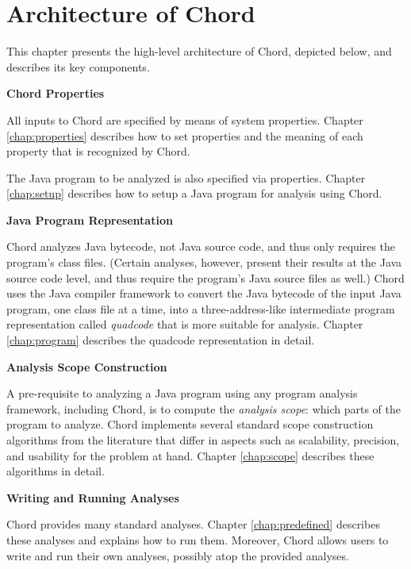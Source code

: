 \chapter{Architecture of Chord}
\label{chap:arch}

This chapter presents the high-level architecture of Chord, depicted below, and describes its key components.

\begin{center}
\end{center}

{\bf Chord Properties}

All inputs to Chord are specified by means of system properties.  Chapter
\ref{chap:properties} describes how to set properties and the meaning of each
property that is recognized by Chord.

The Java program to be analyzed is also specified via properties.  Chapter
\ref{chap:setup} describes how to setup a Java program for analysis using Chord.

{\bf Java Program Representation}

Chord analyzes Java bytecode, not Java source code, and thus only requires the
program's class files.  (Certain analyses, however, present their results at the
Java source code level, and thus require the program's Java source files as
well.) Chord uses the  Java compiler
framework to convert the Java bytecode of the input Java program, one class file
at a time, into a three-address-like intermediate program representation called
{\it quadcode} that is more suitable for analysis. Chapter \ref{chap:program}
describes the quadcode representation in detail.

{\bf Analysis Scope Construction}

A pre-requisite to analyzing a Java program using any program analysis
framework, including Chord, is to compute the {\it analysis scope}: which parts
of the program to analyze.  Chord implements several standard scope construction
algorithms from the literature that differ in aspects such as scalability,
precision, and usability for the problem at hand.  Chapter \ref{chap:scope}
describes these algorithms in detail.

{\bf Writing and Running Analyses}

Chord provides many standard analyses.  Chapter \ref{chap:predefined} describes
these analyses and explains how to run them.  Moreover, Chord allows users to
write and run their own analyses, possibly atop the provided analyses.

